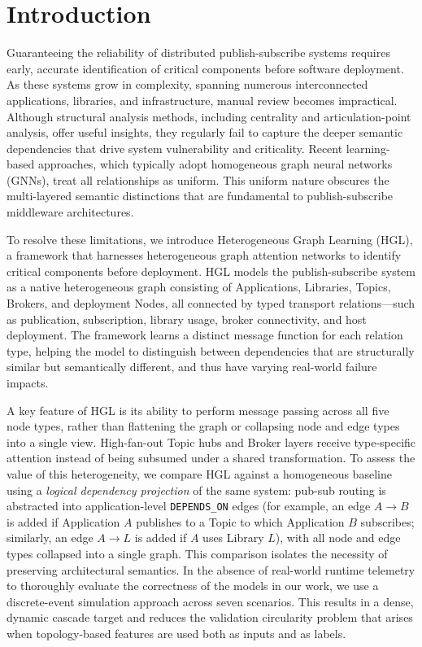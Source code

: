 \documentclass[sigconf,9pt,anonymous]{acmart}
\begin{document}
\maketitle

\section{Introduction}

Guaranteeing the reliability of distributed publish-subscribe systems requires early, accurate identification of critical components before software deployment. As these systems grow in complexity, spanning numerous interconnected applications, libraries, and infrastructure, manual review becomes impractical. Although structural analysis methods, including centrality and articulation-point analysis, offer useful insights, they regularly fail to capture the deeper semantic dependencies that drive system vulnerability and criticality. Recent learning-based approaches, which typically adopt homogeneous graph neural networks (GNNs), treat all relationships as uniform. This uniform nature obscures the multi-layered semantic distinctions that are fundamental to publish-subscribe middleware architectures.

To resolve these limitations, we introduce Heterogeneous Graph Learning (HGL), a framework that harnesses heterogeneous graph attention networks to identify critical components before deployment. HGL models the publish-subscribe system as a native heterogeneous graph consisting of Applications, Libraries, Topics, Brokers, and deployment Nodes, all connected by typed transport relations—such as publication, subscription, library usage, broker connectivity, and host deployment. The framework learns a distinct message function for each relation type, helping the model to distinguish between dependencies that are structurally similar but semantically different, and thus have varying real-world failure impacts.

A key feature of HGL is its ability to perform message passing across all five node types, rather than flattening the graph or collapsing node and edge types into a single view. High-fan-out Topic hubs and Broker layers receive type-specific attention instead of being subsumed under a shared transformation. To assess the value of this heterogeneity, we compare HGL against a homogeneous baseline using a \emph{logical dependency projection} of the same system: pub-sub routing is abstracted into application-level \texttt{DEPENDS\_ON} edges (for example, an edge $A \rightarrow B$ is added if Application $A$ publishes to a Topic to which Application $B$ subscribes; similarly, an edge $A \rightarrow L$ is added if $A$ uses Library $L$), with all node and edge types collapsed into a single graph. This comparison isolates the necessity of preserving architectural semantics. In the absence of real-world runtime telemetry to thoroughly evaluate the correctness of the models in our work, we use a discrete-event simulation approach across seven scenarios. This results in a dense, dynamic cascade target and reduces the validation circularity problem that arises when topology-based features are used both as inputs and as labels.
\end{document}
